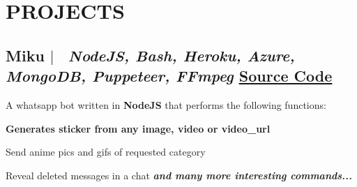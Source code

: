 \documentclass[11pt]{article}
\begin{document}

\section{PROJECTS}

\subsection*{
  Miku 
  $|$
  \normalsize \normalfont \ \textit{NodeJS, Bash, Heroku, Azure, MongoDB, Puppeteer, FFmpeg}
  \hfill 
  \normalsize \underline{\href{https://github.com/HARSH-SHETH/miku}{Source Code}}
}
  A whatsapp bot written in \textbf{NodeJS} that performs the following functions: 
  \begin{description}
    \setlength{\itemsep}{0em}
    \setlength{\itemindent}{2\parindent}
    \item[$\bullet$]{ \textbf{Generates sticker from any image, video or video\_url }}
    \item[$\bullet$]{ Send anime pics and gifs of requested category}
    \item[$\bullet$]{ Reveal deleted messages in a chat}
    \emph{\textbf{and many more interesting commands...}}
  \end{description}

\end{document}

